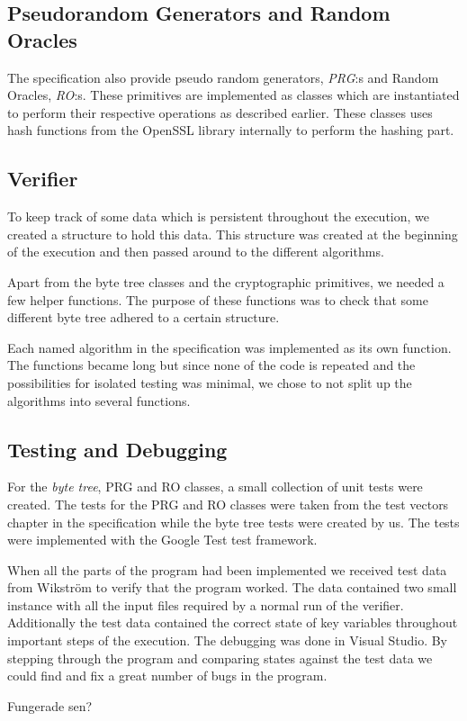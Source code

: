 \subsection{Pseudorandom Generators and Random Oracles}

The specification also provide pseudo random generators, \emph{PRG}:s and Random Oracles, \emph{RO}:s. These primitives are implemented as classes which are instantiated to perform their respective operations as described earlier. These classes uses hash functions from the OpenSSL library internally to perform the hashing part.

\subsection{Verifier}

To keep track of some data which is persistent throughout the execution, we created a structure to hold this data. This structure was created at the beginning of the execution and then passed around to the different algorithms.

Apart from the byte tree classes and the cryptographic primitives, we needed a few helper functions. The purpose of these functions was to check that some different byte tree adhered to a certain structure.

Each named algorithm in the specification was implemented as its own function. The functions became long but since none of the code is repeated and the possibilities for isolated testing was minimal, we chose to not split up the algorithms into several functions.

\subsection{Testing and Debugging}

For the \emph{byte tree}, PRG and RO classes, a small collection of unit tests were created. The tests for the PRG and RO classes were taken from the test vectors chapter in the specification while the byte tree tests were created by us. The tests were implemented with the Google Test test framework.

When all the parts of the program had been implemented we received test data from Wikström to verify that the program worked. The data contained two small instance with all the input files required by a normal run of the verifier. Additionally the test data contained the correct state of key variables throughout important steps of the execution. The debugging was done in Visual Studio. By stepping through the program and comparing states against the test data we could find and fix a great number of bugs in the program.

Fungerade sen?
